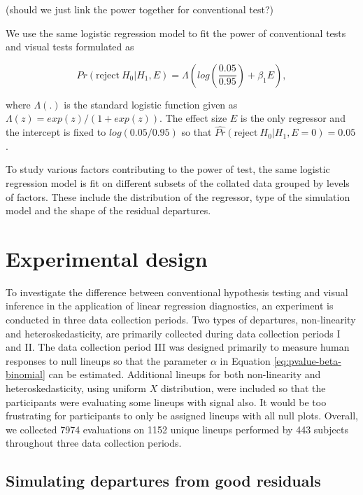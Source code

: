 \documentclass[]{interact}
\theoremstyle{plain}%
\theoremstyle{definition}
\theoremstyle{remark}
\begin{document}
(should we just link the power together for conventional test?)

We use the same logistic regression model to fit the power of
conventional tests and visual tests formulated as

\begin{equation} \label{eq:logistic-regression-1-1}
Pr(\text{reject}~H_0|H_1,E) = \Lambda\left(log\left(\frac{0.05}{0.95}\right) + \beta_1 E\right),
\end{equation}

\noindent where \(\Lambda(.)\) is the standard logistic function given
as \(\Lambda(z) = exp(z)/(1+exp(z))\). The effect size \(E\) is the only
regressor and the intercept is fixed to \(log(0.05/0.95)\) so that
\(\hat{Pr}(\text{reject}~H_0|H_1,E = 0) = 0.05\).

To study various factors contributing to the power of test, the same
logistic regression model is fit on different subsets of the collated
data grouped by levels of factors. These include the distribution of the
regressor, type of the simulation model and the shape of the residual
departures.

\hypertarget{experimental-design}{%
\section{Experimental design}\label{experimental-design}}

To investigate the difference between conventional hypothesis testing
and visual inference in the application of linear regression
diagnostics, an experiment is conducted in three data collection
periods. Two types of departures, non-linearity and heteroskedasticity,
are primarily collected during data collection periods I and II. The
data collection period III was designed primarily to measure human
responses to null lineups so that the parameter \(\alpha\) in Equation
\ref{eq:pvalue-beta-binomial} can be estimated. Additional lineups for
both non-linearity and heteroskedasticity, using uniform \(X\)
distribution, were included so that the participants were evaluating
some lineups with signal also. It would be too frustrating for
participants to only be assigned lineups with all null plots. Overall,
we collected 7974 evaluations on 1152 unique lineups performed by 443
subjects throughout three data collection periods.

\hypertarget{simulating-departures-from-good-residuals}{%
\subsection{Simulating departures from good
residuals}\label{simulating-departures-from-good-residuals}}
\end{document}
